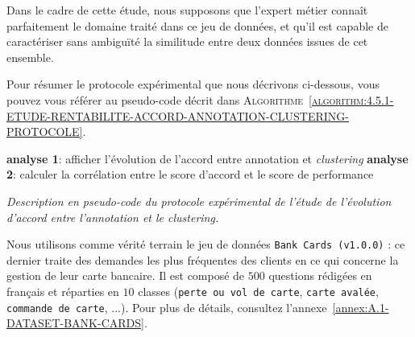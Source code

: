 			\begin{leftBarWarning}
				Dans le cadre de cette étude, nous supposons que l'expert métier connaît parfaitement le domaine traité dans ce jeu de données, et qu'il est capable de caractériser sans ambiguïté la similitude entre deux données issues de cet ensemble.
			\end{leftBarWarning}
			
			Pour résumer le protocole expérimental que nous décrivons ci-dessous, vous pouvez vous référer au pseudo-code décrit dans \textsc{Algorithme~\ref{algorithm:4.5.1-ETUDE-RENTABILITE-ACCORD-ANNOTATION-CLUSTERING-PROTOCOLE}}.
			
			\begin{algorithm}
				\textbf{analyse 1}: afficher l'évolution de l'accord entre annotation et \textit{clustering} \;
				\textbf{analyse 2}: calculer la corrélation entre le score d'accord et le score de performance \;
				\caption{\textit{
					Description en pseudo-code du protocole expérimental de l'étude de l'évolution d'accord entre l'annotation et le \textit{clustering}.
				}}
				\label{algorithm:4.5.1-ETUDE-RENTABILITE-ACCORD-ANNOTATION-CLUSTERING-PROTOCOLE}
			\end{algorithm}
			
			Nous utilisons comme vérité terrain le jeu de données \texttt{Bank Cards (v1.0.0)} : ce dernier traite des demandes les plus fréquentes des clients en ce qui concerne la gestion de leur carte bancaire.
			Il est composé de $500$ questions rédigées en français et réparties en $10$ classes (\texttt{perte ou vol de carte}, \texttt{carte avalée}, \texttt{commande de carte}, ...).
			Pour plus de détails, consultez l'annexe~\ref{annex:A.1-DATASET-BANK-CARDS}.
			
